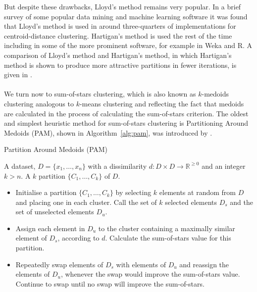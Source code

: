\documentclass[a4paper]{report}
\newcommand{\dset}{D}
\begin{document}
But despite these drawbacks, Lloyd's method remains very popular.  In a brief
survey of some popular data mining and machine learning software it was found
that Lloyd's method is used in around three-quarters of implementations for
centroid-distance clustering.  Hartigan's method is used the rest of the time
including in some of the more prominent software, for example in Weka and R.
A comparison of Lloyd's method and Hartigan's method, in which Hartigan's
method is shown to produce more attractive partitions in fewer iterations, is
given in \citep{telgarsky2010hartigan}.
\\\\
\noindent We turn now to sum-of-stars clustering, which is also known as
$k$-medoids clustering analogous to $k$-means clustering and reflecting the
fact that medoids are calculated in the process of calculating the
sum-of-stars criterion.  The oldest and simplest heuristic method for
sum-of-stars clustering is Partitioning Around Medoids (PAM), shown in
Algorithm~\ref{alg:pam}, was introduced by \citet{kaufman2005finding}.
\begin{algorithm}[h]
  \caption{Partition Around Medoids (PAM)}
  \label{alg:pam}
  \begin{algorithmic}
    \Require A dataset, $\dset = \{x_1,\dotsc,x_n\}$ with a dissimilarity $d
             \colon \dset \times \dset \to \mathbb{R}^{\geq 0}$ and an integer
             $k > n$.
    \Ensure  A $k$ partition $\{C_1,\dotsc,C_k\}$ of $\dset$.
    \begin{itemize}
    \item Initialise a partition $\{C_1,\dotsc,C_k\}$ by selecting $k$
      elements at random from $\dset$ and placing one in each cluster.  Call
      the set of $k$ selected elements $\dset_s$ and the set of unselected
      elements $\dset_u$.
    \item Assign each element in $\dset_u$ to the cluster containing a
      maximally similar element of $\dset_s$, according to $d$.  Calculate the
      sum-of-stars value for this partition.
    \item Repeatedly swap elements of $\dset_s$ with elements of $\dset_u$ and
      reassign the elements of $\dset_u$, whenever the swap would improve the
      sum-of-stars value.  Continue to swap until no swap will improve the
      sum-of-stars.
    \end{itemize}
  \end{algorithmic}

\end{algorithm}
\end{document}
